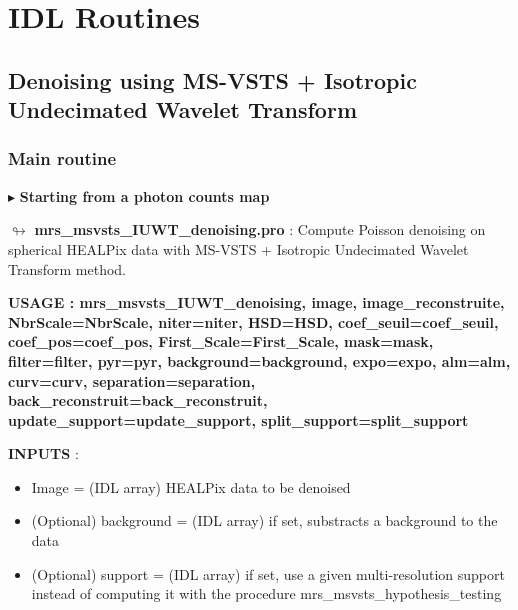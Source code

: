  
\chapter{IDL Routines}
\label{ch_idlproc}

 
\section{Denoising using MS-VSTS + Isotropic Undecimated Wavelet Transform}

\subsection{Main routine}

\vspace{0.3cm}

$\blacktriangleright$   \textbf {Starting from a photon counts map}

\vspace{0.3cm}

$\looparrowright$ \textbf{mrs\_msvsts\_IUWT\_denoising.pro} :  Compute Poisson denoising on spherical HEALPix data with MS-VSTS + Isotropic Undecimated Wavelet Transform method.


\begin{center}
 \bf{USAGE : mrs\_msvsts\_IUWT\_denoising, image, image\_reconstruite, NbrScale=NbrScale, niter=niter, HSD=HSD, coef\_seuil=coef\_seuil, coef\_pos=coef\_pos, First\_Scale=First\_Scale, mask=mask, filter=filter, pyr=pyr, background=background, expo=expo, alm=alm, curv=curv, separation=separation, back\_reconstruit=back\_reconstruit, update\_support=update\_support, split\_support=split\_support}
\end{center}

\textbf{INPUTS} : 
\begin{itemize}
\item{Image = (IDL array) HEALPix data to be denoised}
\item{(Optional) background = (IDL array) if set, substracts a background to the data}
\item{(Optional) support = (IDL array) if set, use a given multi-resolution support instead of computing it with the procedure mrs\_msvsts\_hypothesis\_testing}
\end{itemize}

